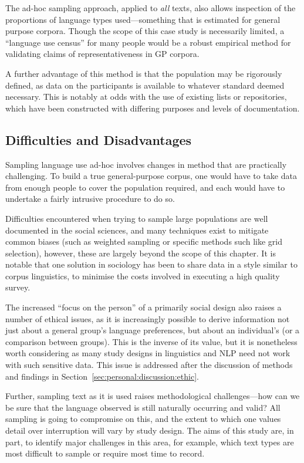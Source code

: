 The ad-hoc sampling approach, applied to \textsl{all} texts, also allows inspection of the proportions of language types used---something that is estimated for general purpose corpora.  Though the scope of this case study is necessarily limited, a ``language use census'' for many people would be a robust empirical method for validating claims of representativeness in GP corpora.


A further advantage of this method is that the population may be rigorously defined, as data on the participants is available to whatever standard deemed necessary.  This is notably at odds with the use of existing lists or repositories, which have been constructed with differing purposes and levels of documentation.






\subsection{Difficulties and Disadvantages}
Sampling language use ad-hoc involves changes in method that are practically challenging.  To build a true general-purpose corpus, one would have to take data from enough people to cover the population required, and each would have to undertake a fairly intrusive procedure to do so.

Difficulties encountered when trying to sample large populations are well documented in the social sciences, and many techniques exist to mitigate common biases (such as weighted sampling or specific methods such like grid selection), however, these are largely beyond the scope of this chapter.  It is notable that one solution in sociology has been to share data in a style similar to corpus linguistics, to minimise the costs involved in executing a high quality survey.

The increased ``focus on the person'' of a primarily social design also raises a number of ethical issues, as it is increasingly possible to derive information not just about a general group's language preferences, but about an individual's (or a comparison between groups).  This is the inverse of its value, but it is nonetheless worth considering as many study designs in linguistics and NLP need not work with such sensitive data.  This issue is addressed after the discussion of methods and findings in Section~\ref{sec:personal:discussion:ethic}.

Further, sampling text as it is used raises methodological challenges---how can we be sure that the language observed is still naturally occurring and valid?  All sampling is going to compromise on this, and the extent to which one values detail over interruption will vary by study design.  The aims of this study are, in part, to identify major challenges in this area, for example, which text types are most difficult to sample or require most time to record.


